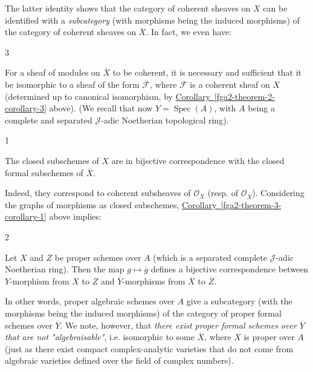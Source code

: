   The latter identity shows that the category of coherent sheaves on \(X\) can be identified with a \emph{subcategory} (with morphisms being the induced morphisms) of the category of coherent sheaves on \(\overline {X}\).
  In fact, we even have:\begin{theorem}{3}\label{fga2-theorem-3}\skipsinglepar\par{}For a sheaf of modules on \(\overline {X}\) to be coherent, it is necessary and sufficient that it be isomorphic to a sheaf of the form \(\overline {\mathscr {F}}\), where \(\mathscr {F}\) is a coherent sheaf on \(X\) (determined up to canonical isomorphism, by \hyperref[fga2-theorem-2-corollary-3]{Corollary~\ref*{fga2-theorem-2-corollary-3}} above).
    (We recall that now \(Y=\operatorname {Spec}(A)\), with \(A\) being a complete and separated \(\mathscr {J}\)-adic Noetherian topological ring).\end{theorem}\begin{corollary}{1}\label{fga2-theorem-3-corollary-1}\skipsinglepar\par{}The closed subschemes of \(X\) are in bijective correspondence with the closed formal subschemes of \(\overline {X}\).\end{corollary}\par{}Indeed, they correspond to coherent subsheaves of \(\mathcal {O}_X\) (resp. of \(\mathcal {O}_{\overline {X}}\)).
  Considering the graphs of morphisms as closed subschemes, \hyperref[fga2-theorem-3-corollary-1]{Corollary~\ref*{fga2-theorem-3-corollary-1}} above implies:\begin{corollary}{2}\label{fga2-theorem-3-corollary-2}\skipsinglepar\par{}Let \(X\) and \(Z\) be proper schemes over \(A\) (which is a separated complete \(\mathscr {J}\)-adic Noetherian ring).
    Then the map \(g\mapsto \overline {g}\) defines a bijective correspondence between \(Y\)-morphism from \(X\) to \(Z\) and \(\overline {Y}\)-morphisms from \(\overline {X}\) to \(\overline {Z}\).\end{corollary}\par{}In other words, proper algebraic schemes over \(A\) give a subcategory (with the morphisms being the induced morphisms) of the category of proper formal schemes over \(\overline {Y}\).
  We note, however, that \emph{there exist proper formal schemes over \(\overline {Y}\) that are not "algebraisable"}, i.e. isomorphic to some \(\overline {X}\), where \(X\) is proper over \(A\) (just as there exist compact complex-analytic varieties that do not come from algebraic varieties defined over the field of complex numbers).

